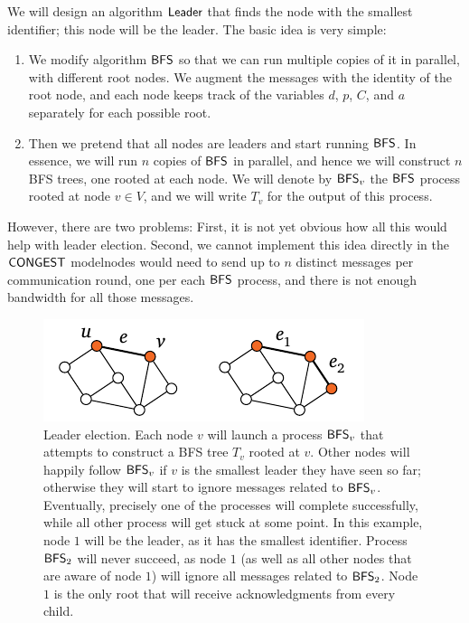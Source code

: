 We will design an algorithm $\textup{\sffamily Leader}$ that finds the node with the smallest identifier; this node will be the leader. The basic idea is very simple:
\begin{enumerate}
    \item We modify algorithm $\textup{\sffamily BFS}$ so that we can run multiple copies of it in parallel, with different root nodes. We augment the messages with the identity of the root node, and each node keeps track of the variables $d$, $p$, $C$, and $a$ separately for each possible root.
    \item Then we pretend that all nodes are leaders and start running $\textup{\sffamily BFS}$. In essence, we will run $n$ copies of $\textup{\sffamily BFS}$ in parallel, and hence we will construct $n$ BFS trees, one rooted at each node. We will denote by $\textup{\sffamily BFS}_v$ the $\textup{\sffamily BFS}$ process rooted at node $v \in V$, and we will write $T_v$ for the output of this process.
\end{enumerate}
However, there are two problems: First, it is not yet obvious how all this would help with leader election. Second, we cannot implement this idea directly in the $\textup{\sffamily CONGEST}$ model\mydash nodes would need to send up to $n$ distinct messages per communication round, one per each $\textup{\sffamily BFS}$ process, and there is not enough bandwidth for all those messages.

\begin{figure}
    \centering
    \includegraphics[page=\PLeader]{figs.pdf}
    \caption{Leader election. Each node $v$ will launch a process $\textup{\sffamily BFS}_v$ that attempts to construct a BFS tree $T_v$ rooted at $v$. Other nodes will happily follow $\textup{\sffamily BFS}_v$ if $v$ is the smallest leader they have seen so far; otherwise they will start to ignore messages related to $\textup{\sffamily BFS}_v$. Eventually, precisely one of the processes will complete successfully, while all other process will get stuck at some point. In this example, node $1$ will be the leader, as it has the smallest identifier. Process $\textup{\sffamily BFS}_2$ will never succeed, as node $1$ (as well as all other nodes that are aware of node $1$) will ignore all messages related to $\textup{\sffamily BFS}_2$. Node $1$ is the only root that will receive acknowledgments from every child.}\label{fig:leader}
\end{figure}

